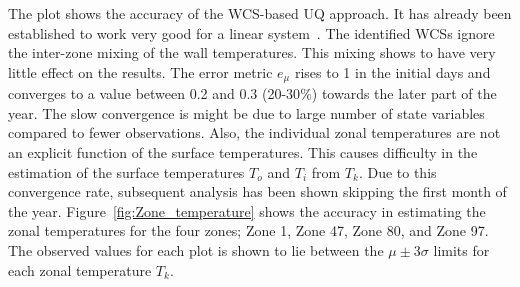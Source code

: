 The plot shows the accuracy of the WCS-based UQ approach. It has already been established to work very good for a linear system~\citep{Mukherjee_2017}. The identified WCSs ignore the inter-zone mixing of the wall temperatures. This mixing shows to have very little effect on the results. The error metric $e_{\mu}$ rises to 1 in the initial days and converges to a value between 0.2 and 0.3 (20-30$\%$) towards the later part of the year. The slow convergence is might be due to large number of state variables compared to fewer observations. Also, the individual zonal temperatures are not an explicit function of the surface temperatures. This causes difficulty in the estimation of the surface temperatures $T_o$ and $T_i$ from $T_k$. Due to this convergence rate, subsequent analysis has been shown skipping the first month of the year. 
Figure~\ref{fig:Zone_temperature} shows the accuracy in estimating the zonal temperatures for the four zones; Zone 1, Zone 47, Zone 80, and Zone 97. The observed values for each plot is shown to lie between the $\mu \pm 3 \sigma$ limits for each zonal temperature $T_k$. 


